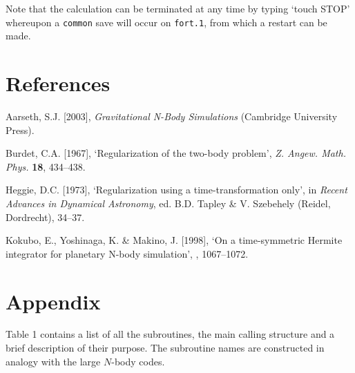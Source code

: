 \documentclass[12pt]{article}
\begin{document}
Note that the calculation can be terminated at any time by typing
`touch STOP' whereupon a {\tt common} save will occur on {\tt fort.1},
from which a restart can be made.


\section*{References}

\medskip
\noindent
Aarseth, S.J. [2003], {\it Gravitational N-Body Simulations}
(Cambridge University Press).

\medskip
\noindent
Burdet, C.A. [1967], `Regularization of the two-body problem',
{\it Z. Angew. Math. Phys.} {\bf 18}, 434--438.

\medskip
\noindent
Heggie, D.C. [1973], `Regularization using a time-transformation only',
in {\it Recent Advances in Dynamical Astronomy}, ed. B.D. Tapley \&
V. Szebehely (Reidel, Dordrecht), 34--37.

\medskip
\noindent
Kokubo, E., Yoshinaga, K. \& Makino, J. [1998], `On a time-symmetric
Hermite integrator for planetary N-body simulation',
, 1067--1072.

\newpage
\bigskip
\section{Appendix}
Table 1 contains a list of all the subroutines, the main calling structure
and a brief description of their purpose.
The subroutine names are constructed in analogy with the large $N$-body
codes.
\end{document}

